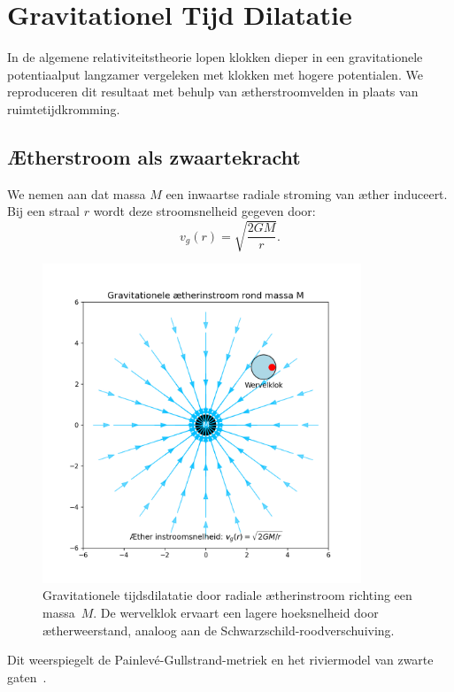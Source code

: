 \section{Gravitationel Tijd Dilatatie}

In de algemene relativiteitstheorie lopen klokken dieper in een gravitationele potentiaalput langzamer vergeleken met klokken met hogere potentialen. We reproduceren dit resultaat met behulp van ætherstroomvelden in plaats van ruimtetijdkromming.

\subsection*{Ætherstroom als zwaartekracht}

We nemen aan dat massa $M$ een inwaartse radiale stroming van æther induceert. Bij een straal $r$ wordt deze stroomsnelheid gegeven door:
\[
    v_g(r) = \sqrt{\frac{2GM}{r}}.
\]


\begin{figure}[htbp]
    \centering
    \includegraphics[width=0.85\textwidth]{4-GravitationeleÆtherinstroom}
    \caption{Gravitationele tijdsdilatatie door radiale ætherinstroom richting een massa~$M$. De wervelklok ervaart een lagere hoeksnelheid door ætherweerstand, analoog aan de Schwarzschild-roodverschuiving.}
    \label{fig:GravitationeleÆtherinstroom}
\end{figure}

Dit weerspiegelt de Painlevé-Gullstrand-metriek en het riviermodel van zwarte gaten~\cite{Hamilton2004-river}.

